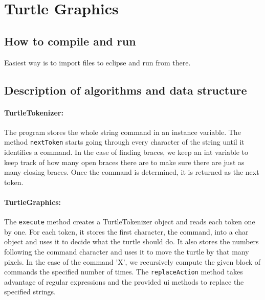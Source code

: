\documentclass[12pt]{article}
\begin{document}

\newcommand{\hmwkClass}{CSCI 255}
\newcommand{\hmwkSemester}{Spring 2016}

\newcommand{\hmwkAuthorName}{Zhuoming Tan}
\newcommand{\hmwkAuthorID}{ztan}

\newcommand{\hmwkAssignmentNum}{2}

\newcommand{\hmwkProblemNum}{1}

\newcommand{\hmwkCollaborators}{Rafael Zuniga}
\thispagestyle{fancycollab}


\section{Turtle Graphics}

\subsection{How to compile and run}
Easiest way is to import files to eclipse and run from there.

\subsection{Description of algorithms and data structure}
\paragraph{TurtleTokenizer:} The program stores the whole string command in an instance variable. The method \texttt{nextToken} starts going through every character of the string until it identifies a command. In the case of finding braces, we keep an int variable to keep track of how many open braces there are to make sure there are just as many closing braces. Once the command is determined, it is returned as the next token.

\paragraph{TurtleGraphics:} The \texttt{execute} method creates a TurtleTokenizer object and reads each token one by one. For each token, it stores the first character, the command, into a char object and uses it to decide what the turtle should do. It also stores the numbers following the command character and uses it to move the turtle by that many pixels. In the case of the command 'X', we recursively compute the given block of commands the specified number of times. The \texttt{replaceAction} method takes advantage of regular expressions and the provided ui methods to replace the specified strings.
\end{document}
